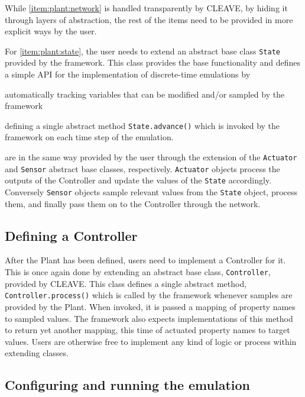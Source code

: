 While \cref{item:plant:network} is handled transparently by CLEAVE, by hiding it through layers of abstraction, the rest of the items need to be provided in more explicit ways by the user.

For \cref{item:plant:state}, the user needs to extend an abstract base class \texttt{State} provided by the framework.
This class provides the base functionality and defines a simple API for the implementation of discrete-time emulations by
\begin{enumerate*}[itemjoin={{; }}, itemjoin*={{; and }}]
    \item automatically tracking variables that can be modified and/or sampled by the framework
    \item defining a single abstract method \texttt{State.advance()} which is invoked by the framework on each time step of the emulation.
\end{enumerate*}

 are in the same way provided by the user through the extension of the \texttt{Actuator} and \texttt{Sensor} abstract base classes, respectively.
\texttt{Actuator} objects process the outputs of the Controller and update the values of the \texttt{State} accordingly.
Conversely \texttt{Sensor} objects sample relevant values from the \texttt{State} object, process them, and finally pass them on to the Controller through the network.

\subsection{Defining a Controller}

After the Plant has been defined, users need to implement a Controller for it.
This is once again done by extending an abstract base class, \texttt{Controller}, provided by CLEAVE.
This class defines a single abstract method, \texttt{Controller.process()} which is called by the framework whenever samples are provided by the Plant.
When invoked, it is passed a mapping of property names to sampled values.
The framework also expects implementations of this method to return yet another mapping, this time of actuated property names to target values.
Users are otherwise free to implement any kind of logic or process within extending classes.

\subsection{Configuring and running the emulation}

